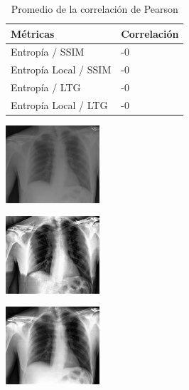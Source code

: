 \documentclass[spanish,twocolumn]{article}
\begin{document}
{\begin{table}[htbp]
\begin{center}
\begin{tabular}{|l|l|}
\hline
Métricas & Correlación \\
\hline \hline
Entropía / SSIM & -0 \\ \hline
Entropía Local / SSIM & -0\\ \hline
Entropía / LTG & -0 \\ \hline
Entropía Local / LTG & -0 \\ \hline
\end{tabular}
\caption{Promedio de la correlación de Pearson}
\label{tabla:promcorrelacion}
\end{center}
\end{table}

\onecolumn
\noindent\begin{minipage}[b]{1.0\linewidth}
  \centering
   
   \begin{minipage}[t]{0.3\linewidth}  
   		\centering
        \includegraphics[width=3.5cm]{Figures/entropia_normal_ssim/imagen3.png}
  	\end{minipage}
  \hspace{1pt}
   \begin{minipage}[t]{0.3\linewidth}  
   		\centering
        \includegraphics[width=3.5cm]{Figures/entropia_normal_ssim/imagen3_210_2_0-078487.png}
  	\end{minipage}
  \hspace{1pt}
   \begin{minipage}[t]{0.3\linewidth}  
   		\centering
        \includegraphics[width=3.5cm]{Figures/entropia_normal_ssim/imagen3_2_2_0-85964.png}
  	\end{minipage}
  \vspace{0.5cm}
    \label{fig:resultado1}


\end{minipage}}
\end{document}
